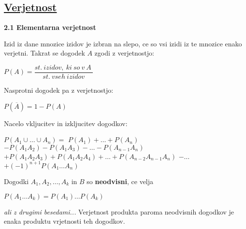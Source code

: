 \documentclass{article}
\begin{document}
\begin{multicols}{3}
\section{\underline{Verjetnost}}


\textbf{2.1 Elementarna verjetnost}
\smallskip

Izid iz dane mnozice izidov je izbran na slepo, ce so vsi izidi
iz te mnozice enako verjetni. Takrat se dogodek $A$ zgodi z verjetnostjo:
\begin{center}
    \begin{math}
        P(A) = \dfrac{st.\: izidov,\: ki\: so\: v\: A\:}{st.\: vseh\: izidov}
    \end{math}    
\end{center}
Nasprotni dogodek pa z verjetnostjo:
\begin{center}
    \begin{math}
        P(\overline{A}) = 1 - P(A)
    \end{math}    
\end{center}
Nacelo vkljucitev in izkljucitev dogodkov:
\begin{center}
    \begin{math}
        P(A_{1} \cup \dots \cup A_{n}) =
    \end{math}
    \begin{math}
        P(A_{1}) + \dots + P(A_{n})
    \end{math}
    \begin{math}
        - P(A_{1} A_{2}) - P(A_{1} A_{3}) - \dots - P(A_{n - 1} A_{n})
    \end{math}
    \begin{math}
        + P(A_{1} A_{2} A_{3}) +P (A_{1} A_{2} A_{4}) + \dots + P(A_{n - 2} A_{n - 1} A_{n})
    \end{math}
    \begin{math}
        - \dots
    \end{math}
    \begin{math}
        + (-1)^{n + 1} P(A_{1} \dots A_{n})
    \end{math}
\end{center}
Dogodki $A_{1}, A_{2}, \dots , A_{k}$ in $B$ so \textbf{neodvisni}, ce velja
\begin{center}
    \begin{math}
        P(A_{1} \dots A_{k}) = P(A_{1}) \dots P(A_{k})
    \end{math}
\end{center}
\textit{ali z drugimi besedami...} Verjetnost produkta paroma neodvisnih
dogodkov je enaka produktu vrjetnosti teh dogodkov.


\end{multicols}
\end{document}
